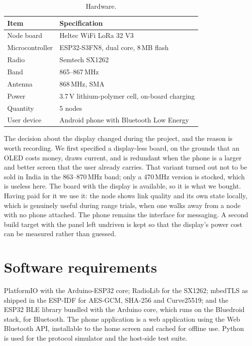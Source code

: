 \documentclass[12pt,a4paper,oneside]{report}
\begin{document}
\begin{table}[htbp]
\centering
\begin{tabular}{@{}ll@{}}
\toprule
Item & Specification \\
\midrule
Node board & Heltec WiFi LoRa 32 V3 \\
Microcontroller & ESP32-S3FN8, dual core, 8\,MB flash \\
Radio & Semtech SX1262 \\
Band & 865--867\,MHz \\
Antenna & 868\,MHz, SMA \\
Power & 3.7\,V lithium-polymer cell, on-board charging \\
Quantity & 5 nodes \\
User device & Android phone with Bluetooth Low Energy \\
\bottomrule
\end{tabular}
\caption{Hardware.}
\label{tab:hw}
\end{table}

The decision about the display changed during the project, and the reason is
worth recording. We first specified a display-less board, on the grounds that
an OLED costs money, draws current, and is redundant when the phone is a
larger and better screen that the user already carries. That variant turned
out not to be sold in India in the 863--870\,MHz band; only a 470\,MHz version
is stocked, which is useless here. The board with the display is available, so
it is what we bought. Having paid for it we use it: the node shows link
quality and its own state locally, which is genuinely useful during range
trials, when one walks away from a node with no phone attached. The phone
remains the interface for messaging. A second build target with the panel left
undriven is kept so that the display's power cost can be measured rather than
guessed.

\section{Software requirements}

PlatformIO with the Arduino-ESP32 core; RadioLib for the SX1262; mbedTLS as
shipped in the ESP-IDF for AES-GCM, SHA-256 and Curve25519; and the ESP32 BLE
library bundled with the Arduino core, which runs on the Bluedroid stack, for
Bluetooth. The phone application is a web application using the Web
Bluetooth API, installable to the home screen and cached for offline use. Python
is used for the protocol simulator and the host-side test suite.
\end{document}
